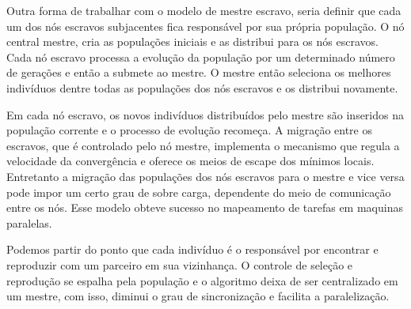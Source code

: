 \begin{minipage}{\linewidth}
	\label{fig:AGParallelJohn}
\end{minipage}

Outra forma de trabalhar com o modelo de mestre escravo, seria definir que cada um dos nós escravos subjacentes fica responsável por sua própria população. O nó central mestre, cria as populações iniciais e as distribui para os nós escravos. Cada nó escravo processa a evolução da população por um determinado número de gerações e então a submete ao mestre. O mestre então seleciona os melhores indivíduos dentre todas as populações dos nós escravos e os distribui novamente. 

Em cada nó escravo, os novos indivíduos distribuídos pelo mestre são inseridos na população corrente e o processo de evolução recomeça. A migração entre os escravos, que é controlado pelo nó mestre, implementa o mecanismo que regula a velocidade da convergência e oferece os meios de escape dos mínimos locais. Entretanto a migração das populações dos nós escravos para o mestre e vice versa pode impor um certo grau de sobre carga, dependente do meio de comunicação entre os nós. Esse modelo obteve sucesso no mapeamento de tarefas em maquinas paralelas. \cite{Alaoui}

Podemos partir do ponto que cada indivíduo é o responsável por encontrar e reproduzir com um parceiro em sua vizinhança. O controle de seleção e reprodução se espalha pela população e o algoritmo deixa de ser centralizado em um mestre, com isso, diminui o grau de sincronização e facilita a paralelização. 

